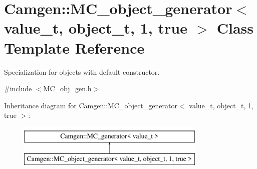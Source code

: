 \hypertarget{a00366}{\section{Camgen\-:\-:M\-C\-\_\-object\-\_\-generator$<$ value\-\_\-t, object\-\_\-t, 1, true $>$ Class Template Reference}
\label{a00366}
}


Specialization for objects with default constructor.  




{\ttfamily \#include $<$M\-C\-\_\-obj\-\_\-gen.\-h$>$}

Inheritance diagram for Camgen\-:\-:M\-C\-\_\-object\-\_\-generator$<$ value\-\_\-t, object\-\_\-t, 1, true $>$\-:\begin{figure}[H]
\begin{center}
\leavevmode
\includegraphics[height=2.000000cm]{a00366}
\end{center}
\end{figure}
